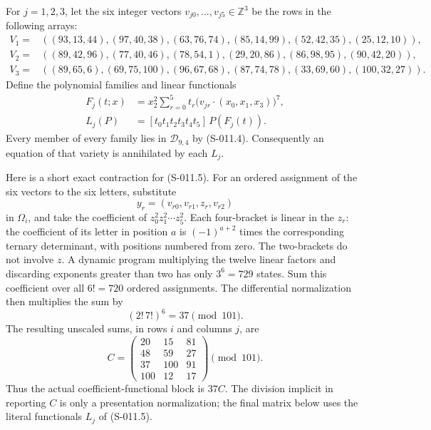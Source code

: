 For $j=1,2,3$, let the six integer vectors
$v_{j0},\ldots,v_{j5}\in\mathbb Z^3$ be the rows in the following arrays:
\[
\begin{split}
V_1={}&((93,13,44),(97,40,38),(63,76,74),
         (85,14,99),(52,42,35),(25,12,10)),\\
V_2={}&((89,42,96),(77,40,46),(78,54,1),
         (29,20,86),(86,98,95),(90,42,20)),\\
V_3={}&((89,65,6),(69,75,100),(96,67,68),
         (87,74,78),(33,69,60),(100,32,27)).
\end{split}
\]
Define the polynomial families and linear functionals
\[
\begin{split}
 F_j(t;x)&=x_2^2\sum_{r=0}^5
       t_r\bigl(v_{jr}\cdot(x_0,x_1,x_3)\bigr)^7,\\
 L_j(P)&=[t_0t_1t_2t_3t_4t_5]\,P(F_j(t)).
\end{split}                                                     \tag{S-011.5}
\]
Every member of every family lies in $\mathcal D_{9,4}$ by
(S-011.4). Consequently an equation of that variety is annihilated
by each $L_j$.

Here is a short exact contraction for (S-011.5).
For an ordered assignment of the six vectors to the six letters,
substitute
\[
          y_r=(v_{r0},v_{r1},z_r,v_{r2})
\]
in $\Omega_i$, and take the coefficient of
$z_0^2z_1^2\cdots z_5^2$. Each four-bracket is linear in the $z_r$:
the coefficient of its letter in position $a$ is
$(-1)^{a+2}$ times the corresponding ternary determinant, with
positions numbered from zero. The two-brackets do not involve $z$.
A dynamic program multiplying the twelve linear factors and
discarding exponents greater than two has only $3^6=729$ states.
Sum this coefficient over all $6!=720$ ordered assignments.
The differential normalization then multiplies the sum by
\[
                         (2!\,7!)^6=37\pmod {101}.             \tag{S-011.6}
\]
The resulting unscaled sums, in rows $i$ and columns $j$, are
\[
 C=
 \begin{pmatrix}
 20&15&81\\
 48&59&27\\
 37&100&91\\
 100&12&17
 \end{pmatrix}\pmod {101}.
\tag{S-011.7}
\]
Thus the actual coefficient-functional block is $37C$.
The division implicit in reporting $C$ is only a presentation
normalization; the final matrix below uses the literal functionals
$L_j$ of (S-011.5).


